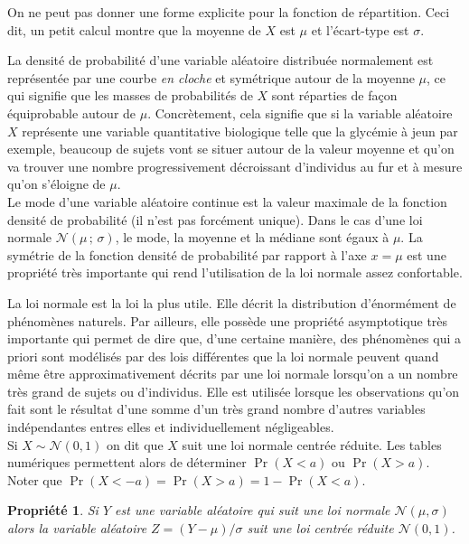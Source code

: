 \documentclass[12pt, a4paper]{book}
\newtheorem{prop}[thm]{Propriété}
\numberwithin{equation}{section}
\begin{document}
\noindent On ne peut pas donner une forme explicite pour la fonction de répartition. Ceci dit,  un petit calcul montre que la  moyenne de $X$ est $\mu$ et l'écart-type est $\sigma$.

La densité de probabilité d'une variable aléatoire distribuée
normalement est représentée par une courbe {\it en cloche} et
symétrique autour de la moyenne $\mu$, ce qui signifie que les
masses de probabilités de $X$ sont réparties de fa\c con
équiprobable autour de $\mu$. 
Concrètement, cela signifie que
si la variable aléatoire $X$ représente une variable
quantitative biologique telle que la glycémie à jeun
par exemple, beaucoup de sujets vont se situer autour de la valeur
moyenne et qu'on va trouver une nombre progressivement
décroissant d'individus au fur et à mesure qu'on s'éloigne
de $\mu$.\\




Le mode d'une variable aléatoire continue est la valeur maximale de la fonction densité de probabilité 
(il n'est pas forcément unique). 
Dans le cas d'une
loi normale $\mathcal{N}(\mu\,;\,\sigma)$, le mode, la moyenne et la médiane sont égaux à $\mu$. La
symétrie de la fonction densité de probabilité par rapport à l'axe $x=\mu$ est une propriété très importante qui
rend l'utilisation de la loi normale assez confortable.

La loi normale est la loi la plus utile. Elle décrit la distribution d'énormément de phénomènes naturels. Par ailleurs,
elle possède une propriété asymptotique très importante qui  permet de dire que, d'une certaine manière, des 
phénomènes qui a priori sont modélisés par des lois différentes que la loi normale peuvent quand même être 
approximativement décrits par une loi normale lorsqu'on a un nombre très grand de sujets ou d'individus.
Elle est utilisée lorsque les observations qu'on fait sont le résultat d'une somme d'un très grand nombre d'autres 
variables indépendantes entres elles et individuellement négligeables.\\


 Si $X\sim\mathcal{N}(0,1)$ on dit que
$X$ suit une loi normale centrée réduite. Les tables
numériques permettent alors de déterminer $\Pr(X<a)$ ou
$\Pr(X>a)$. Noter que $\Pr(X<-a)=\Pr(X>a)=1-\Pr(X<a)$.\\

\begin{prop}
Si $Y$ est une variable aléatoire qui suit une loi normale $\mathcal{N}(\mu,\sigma)$ alors la variable
aléatoire $Z=(Y-\mu )/ \sigma$ suit une loi centrée réduite $\mathcal{N}(0,1)$. 
\end{prop}
\end{document}
